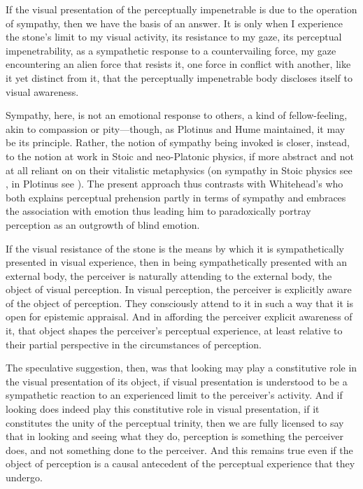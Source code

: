 \documentclass[12pt]{article}
\begin{document}
If the visual presentation of the perceptually impenetrable is due to the operation of sympathy, then we have the basis of an answer. It is only when I experience the stone’s limit to my visual activity, its resistance to my gaze, its perceptual impenetrability, as a sympathetic response to a countervailing force, my gaze encountering an alien force that resists it, one force in conflict with another, like it yet distinct from it, that the perceptually impenetrable body discloses itself to visual awareness.

Sympathy, here, is not an emotional response to others, a kind of fellow-feeling, akin to compassion or pity---though, as Plotinus and  Hume maintained, it may be its principle. Rather, the notion of sympathy being invoked is closer, instead, to the notion at work in Stoic and neo-Platonic physics, if more abstract and not at all reliant on on their vitalistic metaphysics (on sympathy in Stoic physics see \citealt{Brouwer:2015ee}, in Plotinus see \citealt{Emilsson:2015wf}). The present approach thus contrasts with Whitehead’s \citeyearpar{Whitehead:1978zr} who both explains perceptual prehension partly in terms of sympathy and embraces the association with emotion thus leading him to paradoxically portray perception as an outgrowth of blind emotion.

If the visual resistance of the stone is the means by which it is sympathetically presented in visual experience, then in being sympathetically presented with an external body, the perceiver is naturally attending to the external body, the object of visual perception. In visual perception, the perceiver is explicitly aware of the object of perception. They consciously attend to it in such a way that it is open for epistemic appraisal. And in affording the perceiver explicit awareness of it, that object shapes the perceiver's perceptual experience, at least relative to their partial perspective in the circumstances of perception.

The speculative suggestion, then, was that looking may play a constitutive role in the visual presentation of its object, if visual presentation is understood to be a sympathetic reaction to an experienced limit to the perceiver's activity. And if looking does indeed play this constitutive role in visual presentation, if it constitutes the unity of the perceptual trinity, then we are fully licensed to say that in looking and seeing what they do, perception is something the perceiver does, and not something done to the perceiver. And this remains true even if the object of perception is a causal antecedent of the perceptual experience that they undergo.
\end{document}

